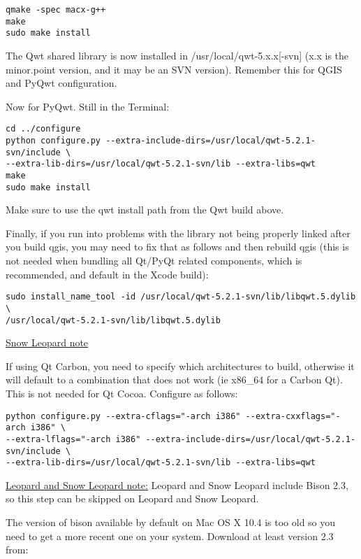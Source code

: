 \begin{verbatim}
qmake -spec macx-g++
make
sudo make install
\end{verbatim}

The Qwt shared library is now installed in /usr/local/qwt-5.x.x[-svn] (x.x is the 
minor.point version, and it may be an SVN version).  Remember this for QGIS and PyQwt configuration.

Now for PyQwt.  Still in the Terminal:

\begin{verbatim}
cd ../configure
python configure.py --extra-include-dirs=/usr/local/qwt-5.2.1-svn/include \
--extra-lib-dirs=/usr/local/qwt-5.2.1-svn/lib --extra-libs=qwt
make
sudo make install
\end{verbatim}

Make sure to use the qwt install path from the Qwt build above.

Finally, if you run into problems with the library not being properly linked after you build qgis, you may need to fix that as follows and then rebuild qgis (this is not needed when bundling all Qt/PyQt related components, which is recommended, and default in the Xcode build):

\begin{verbatim}
sudo install_name_tool -id /usr/local/qwt-5.2.1-svn/lib/libqwt.5.dylib \
/usr/local/qwt-5.2.1-svn/lib/libqwt.5.dylib
\end{verbatim}

\underline{Snow Leopard note}

If using Qt Carbon, you need to specify which architectures to build, otherwise
it will default to a combination that does not work (ie x86\_64 for a Carbon Qt).
This is not needed for Qt Cocoa. Configure as follows:

\begin{verbatim}
python configure.py --extra-cflags="-arch i386" --extra-cxxflags="-arch i386" \
--extra-lflags="-arch i386" --extra-include-dirs=/usr/local/qwt-5.2.1-svn/include \
--extra-lib-dirs=/usr/local/qwt-5.2.1-svn/lib --extra-libs=qwt
\end{verbatim}

\hypertarget{toc32}{}
\minisec{Additional Dependencies : Bison}
\underline{Leopard and Snow Leopard note:} Leopard and Snow Leopard include Bison 2.3, so this step can be skipped on Leopard and Snow Leopard.

The version of bison available by default on Mac OS X 10.4 is too old so you need to
get a more recent one on your system. Download at least version 2.3 from:


